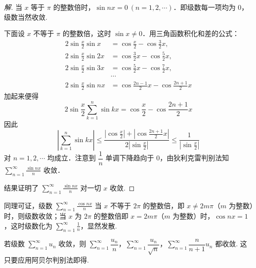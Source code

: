 \begin{proof}[解]
当 $x$ 等于 $\pi$ 的整数倍时，$\sin nx=0\ (n=1,2,\cdots)$．即级数每一项均为 $0$，级数当然收敛.

下面设 $x$ 不等于 $\pi$ 的整数倍，这时 $\sin x\neq0$．用三角函数积化和差的公式：
\[
\begin{aligned}
2\sin\frac{x}{2}\sin x&=\cos\frac{x}{2}-\cos\frac{3}{2}x,\\
2\sin\frac{x}{2}\sin 2x&=\cos\frac{3}{2}x-\cos\frac{5}{2}x,\\
2\sin\frac{x}{2}\sin 3x&=\cos\frac{5}{2}x-\cos\frac{7}{2}x,\\
&\cdots\\
2\sin\frac{x}{2}\sin nx&=\cos\frac{2n-1}{2}x-\cos\frac{2n+1}{2}x
\end{aligned}
\]
加起来便得
\[
2\sin\frac{x}{2}\sum_{k=1}^{n}\sin kx=\cos\frac{x}{2}-\cos\frac{2n+1}{2}x
\]
因此
\[
\left|\sum_{k=1}^{n}\sin kx\right|\leqslant\frac{\left|\cos\frac{x}{2}\right|+\left|\cos\frac{2n+1}{2}x\right|}{2\left|\sin\frac{x}{2}\right|}\leqslant\frac{1}{\left|\sin\frac{x}{2}\right|}
\]
对 $n=1,2,\cdots$ 均成立．注意到 $\dfrac{1}{n}$ 单调下降趋向于 $0$，由狄利克雷判别法知 $\displaystyle\sum_{n=1}^{\infty}\frac{\sin nx}{n}$ 收敛．

结果证明了 $\displaystyle\sum_{n=1}^{\infty}\frac{\sin nx}{n}$ 对一切 $x$ 收敛.
\end{proof}

同理可证，级数 $\displaystyle\sum_{n=1}^{\infty}\frac{\cos nx}{n}$ 当 $x$ 不等于 $2\pi$ 的整数倍，即 $x\neq2m\pi$（$m$ 为整数）时，则级数收敛；当 $x$ 为 $2\pi$ 的整数倍即 $x=2m\pi$（$m$ 为整数）时，$\cos nx=1$，这时级数化为 $\displaystyle\sum_{n=1}^{\infty}\frac{1}{n}$，显然发散.

\begin{example}\label{ex:10-4-3-2}
若级数 $\displaystyle\sum_{n=1}^{\infty}u_{n}$ 收敛，则 $\sum_{n=1}^{\infty}\dfrac{u_{n}}{n}$，$\sum_{n=1}^{\infty}\dfrac{u_{n}}{\sqrt{n}}$，$\sum_{n=1}^{\infty}\dfrac{n}{n+1}u_{n}$ 都收敛. 这只要应用阿贝尔判别法即得.
\end{example}

